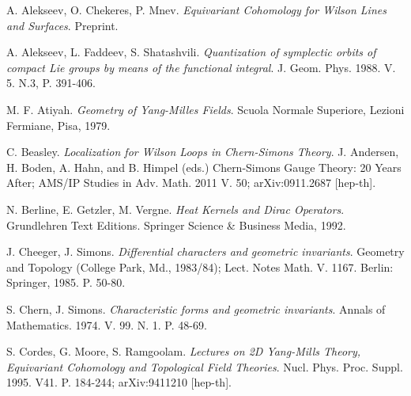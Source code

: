 \documentclass[11pt]{report}
\theoremstyle{plain}
\theoremstyle{definition}
\theoremstyle{remark}
\theoremstyle{remark}
\numberwithin{equation}{section}
\begin{document}
%
%
 






\begin{thebibliography}{99}

 A. Alekseev, O. Chekeres, P. Mnev. 
\textit{Equivariant Cohomology for Wilson Lines and Surfaces}.
Preprint.

 A. Alekseev, L. Faddeev, S. Shatashvili. 
\textit{Quantization of symplectic orbits of compact Lie groups by means of the functional integral}.
 J. Geom. Phys. 1988. V. 5. N.3, P. 391-406.
 
 M. F. Atiyah. 
\textit{Geometry of Yang-Milles Fields}.
 Scuola Normale Superiore, Lezioni Fermiane, Pisa, 1979.
 
 C. Beasley.
\textit{Localization for Wilson Loops in Chern-Simons Theory}.
J. Andersen, H. Boden, A. Hahn, and B. Himpel (eds.) Chern-Simons Gauge Theory: 20 Years After;
AMS/IP Studies in Adv. Math. 2011 V. 50; arXiv:0911.2687 [hep-th].
 
 N. Berline, E. Getzler, M. Vergne. 
\textit{Heat Kernels and Dirac Operators}. 
Grundlehren Text Editions. Springer Science \& Business Media, 1992. 

 J. Cheeger, J. Simons. 
\textit{Differential characters and geometric invariants}.
 Geometry and Topology (College Park, Md., 1983/84); Lect. Notes Math. V. 1167. Berlin: Springer, 1985. P. 50-80.
 
 S. Chern, J. Simons. 
\textit{Characteristic forms and geometric invariants}. 
Annals of Mathematics. 1974. V. 99. N. 1. P. 48-69.

 S. Cordes, G. Moore, S. Ramgoolam. 
\textit{Lectures on 2D Yang-Mills Theory, Equivariant Cohomology and Topological Field Theories}. 
Nucl. Phys. Proc. Suppl. 1995. V41. P. 184-244; arXiv:9411210 [hep-th].


\end{thebibliography}
\end{document}
